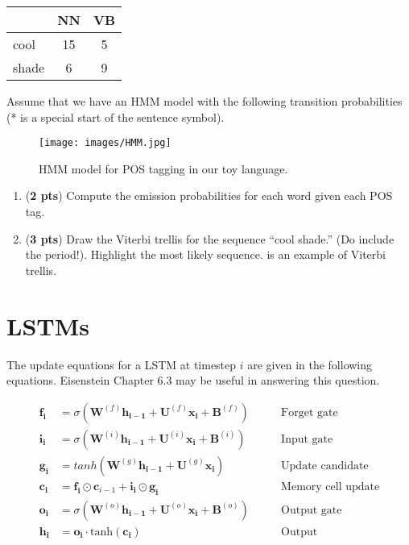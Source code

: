 \documentclass[11pt, letterpaper]{article}
\begin{document}
    \begin{table}[h!]
    \centering
    \small
    \begin{tabular}{|l | c | c |}
    \hline & NN & VB\\
    \hline
    cool & 15 & 5 \\
    shade & 6 & 9\\
    \hline
    \end{tabular}
    \end{table}
    Assume that we have an HMM model with the following transition probabilities (* is a special start of the sentence symbol).
    
    \begin{figure}[h]
    \centering
    \texttt{[image: images/HMM.jpg]}
    \caption{HMM model for POS tagging in our toy language.}
    \end{figure}

\begin{enumerate}[label=(\alph*)]
\item (\textbf{2 pts}) Compute the emission probabilities for each word given each POS tag.\\

\item (\textbf{3 pts}) Draw the Viterbi trellis for the sequence “cool shade.” (Do include the period!). Highlight the most likely sequence. \href{https://web.stanford.edu/~jurafsky/slp3/A.pdf#page=8}{\color{blue}{Here}} is an  example of Viterbi trellis.

\end{enumerate}

\newpage

\section{LSTMs}


The update equations for a LSTM at timestep $i$ are given in the following equations. Eisenstein Chapter 6.3 may be useful in answering this question. 

\begin{align*} 
    \mathbf{f_i} &= \sigma(\mathbf{W}^{(f)} \mathbf{h_{i-1}} + \mathbf{U}^{(f)} \mathbf{x_{i}}    + \mathbf{B}^{(f)} ) \qquad   &\text{Forget gate} \\
    \mathbf{i_i} &= \sigma(\mathbf{W}^{(i)} \mathbf{h_{i-1}} + \mathbf{U}^{(i)} \mathbf{x_{i}}   + \mathbf{B}^{(i)} ) \qquad  &\text{Input gate} \\
    \mathbf{g_i} &= tanh(\mathbf{W}^{(g)} \mathbf{h_{i-1}} + \mathbf{U}^{(g)} \mathbf{x_{i}} )  \qquad   &\text{Update candidate}\\
    \mathbf{c_i} &= \mathbf{f_i} \odot \mathbf{c}_{i-1}  + \mathbf{i_i} \odot \mathbf{g_i}  \qquad   &\text{Memory cell update}\\
    \mathbf{o_i} &= \sigma(\mathbf{W}^{(o)} \mathbf{h_{i-1}} + \mathbf{U}^{(o)} \mathbf{x_{i}}   + \mathbf{B}^{(o)} ) \qquad   &\text{Output gate}\\
    \mathbf{h_i} &= \mathbf{o_i} \cdot \text{tanh}(\mathbf{c_i})  \qquad   &\text{Output} 
\end{align*} 
\end{document}

